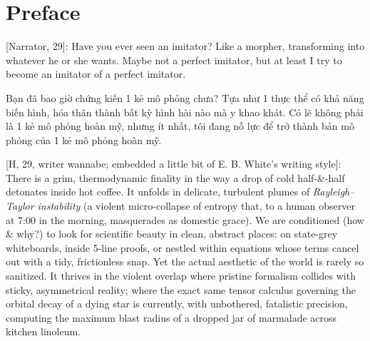 \documentclass[11pt]{article}
\begin{document}

\section{Preface}

%

\textsf{[Narrator, 29]:} Have you ever seen an imitator? Like a morpher, transforming into whatever he or she wants. Maybe not a perfect imitator, but at least I try to become an imitator of a perfect imitator.

Bạn đã bao giờ chứng kiến 1 kẻ mô phỏng chưa? Tựa như 1 thực thể có khả năng biến hình, hóa thân thành bất kỳ hình hài nào mà y khao khát. Có lẽ không phải là 1 kẻ mô phỏng hoàn mỹ, nhưng ít nhất, tôi đang nỗ lực để trở thành bản mô phỏng của 1 kẻ mô phỏng hoàn mỹ.

\textsf{[H, 29, writer wannabe; embedded a little bit of E. B. White's writing style]:} There is a grim, thermodynamic finality in the way a drop of cold half-\&-half detonates inside hot coffee. It unfolds in delicate, turbulent plumes of \textit{Rayleigh--Taylor instability} (a violent micro-collapse of entropy that, to a human observer at 7:00 in the morning, masquerades as domestic grace). We are conditioned (how \& why?) to look for scientific beauty in clean, abstract places: on state-grey whiteboards, inside 5-line proofs, or nestled within equations whose terms cancel out with a tidy, frictionless snap. Yet the actual aesthetic of the world is rarely so sanitized. It thrives in the violent overlap where pristine formalism collides with sticky, asymmetrical reality; where the exact same tensor calculus governing the orbital decay of a dying star is currently, with unbothered, fatalistic precision, computing the maximum blast radius of a dropped jar of marmalade across kitchen linoleum.
\end{document}
